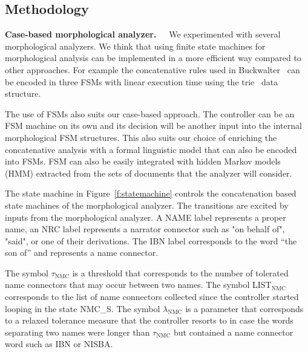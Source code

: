 \documentclass[12pt]{article}
\begin{document}
\subsection{Methodology}
\label{s:design:method}

\begin{figure}
\end{figure}

{\bf Case-based morphological analyzer.~~}
We experimented with several morphological analyzers.
We think that using finite state machines for morphological analysis
can be implemented in a more efficient way compared to other 
approaches. 
For example the concatenative rules used in Buckwalter~\cite{Tim04}
can be encoded in three FSMs with linear execution time using 
the trie~\cite{Aoe:89} data structure. 

The use of FSMs also suits our case-based approach. 
The controller can be an FSM machine on its own and its decision
will be another input into the internal morphological FSM structures. 
This also suits our choice of enriching the concatenative analysis
with a formal linguistic model that can also be encoded into FSMs. 
FSM can also be easily integrated with hidden Markov models (HMM)
extracted from the sets of documents that the analyzer will consider. 

The state machine in Figure~\ref{f:statemachine} controls 
the concatenation based state machines of the morphological
analyzer.
The transitions are excited
by inputs from the morphological analyzer. 
A NAME label represents a proper name, 
an NRC label represents a narrator connector such as
 "on behalf of",  "said", 
or one of their derivations. 
The IBN label corresponds to the word  
``the son of'' and represents a name connector.

The symbol $\tau_{\mbox{NMC}}$ is a threshold
that corresponds to the number of tolerated name connectors 
that may occur between two names. 
The symbol LIST$_{\mbox{NMC}}$ corresponds to the list 
of name connectors collected since the controller
started looping in the state NMC\_S. 
The symbol $\lambda_{\mbox{NMC}}$ is a parameter 
that corresponds to a relaxed tolerance measure that
the controller resorts to in case the words separating
two names were longer than $\tau_{\mbox{NMC}}$ but 
contained a name connector word such as IBN or NISBA.
\end{document}
